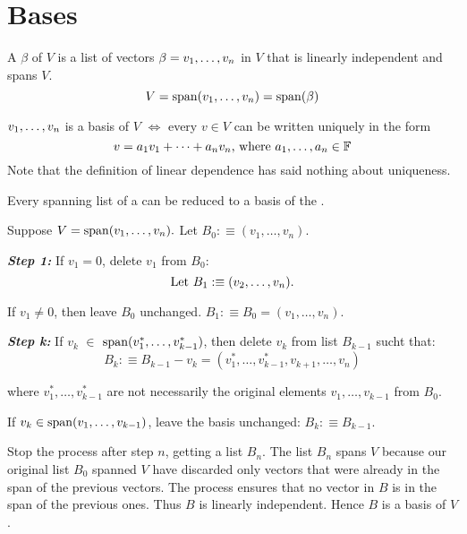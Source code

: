 \section{Bases}


\setcounter{thm}{25}
\begin{mydef} [basis]
  A  $\beta$ of $V$ is a list of vectors $\beta = v_1, \dots, v_n$ in $V$ that is linearly independent and spans $V$.
  \begin{equation}
    V = \operatorname{span} (v_1, \dots, v_n) = \operatorname{span} ( \beta )
  \end{equation}
\end{mydef}

\setcounter{thm}{27}
\begin{thm} 
  $v_1, \dots, v_n$ is a basis of $V$ $\iff$ every $v \in V$ can be written uniquely in the form
  \begin{equation}
    v=a_1 v_1 + \dots + a_n v_n $, where $ a_1, \dots, a_n \in \myF
  \end{equation}
  Note that the definition of linear dependence has said nothing about uniqueness.
\end{thm}

\setcounter{thm}{29}
\begin{thm} 
  \label{thm: every spanning list contains a basis}
  Every spanning list of a \vs can be reduced to a basis of the \vs.
\end{thm}
\begin{prf}
  Suppose $V=\operatorname{span} (v_1, \ldots, v_n).$ Let $B_0 :\equiv (v_1, \ldots, v_n)$.

  \emph{\bfseries Step 1: } If $v_1 = 0$, delete $v_1$ from $B_0$:
  \begin{equation}
    $Let $B_1 :\equiv (v_2, \ldots, v_n).
  \end{equation}

  If $v_1 \neq 0$, then leave $B_0$ unchanged. $B_1 :\equiv B_0=(v_1, \ldots, v_n)$.

  \emph{\bfseries Step k: } If $v_k$ $\in$ $\operatorname{span} (v_1^*, \ldots, v_{k-1}^*)$, then delete $v_k$ from list $B_{k-1}$ sucht that:
  \begin{equation}
    B_k :\equiv B_{k-1} - v_k = (v_{1}^*, \ldots, v_{k-1}^*, v_{k+1}, \ldots, v_n)
  \end{equation}

  where $v_1^*, \ldots, v_{k-1}^*$ are not necessarily the original elements $v_1, \ldots, v_{k-1}$ from $B_0$.

  If $v_k \in \operatorname{span} (v_1, \ldots, v_{k-1})$, leave the basis unchanged: $B_k :\equiv B_{k-1}$.

  Stop the process after step $n$, getting a list $B_n$. The list $B_n$ spans $V$ because our original list $B_0$ spanned $V$  have discarded only vectors that were already in the span of the previous vectors. The process ensures that no vector in $B$ is in the span of the previous ones. Thus $B$ is linearly independent. Hence $B$ is a basis of $V$.
\end{prf}

